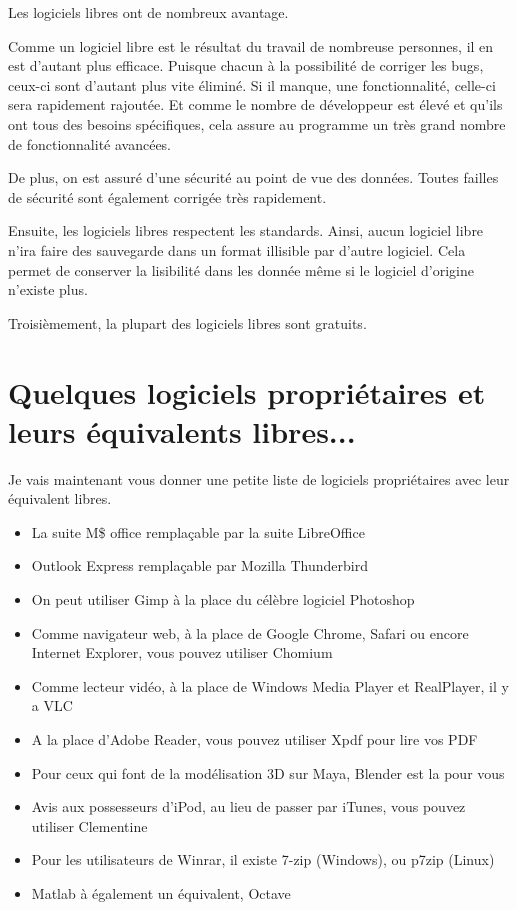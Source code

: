 Les logiciels libres ont de nombreux avantage.

Comme un logiciel libre est le résultat du travail de nombreuse personnes, il en est d'autant plus efficace. Puisque chacun à la possibilité de corriger les bugs, ceux-ci sont d'autant plus vite éliminé. Si il manque, une fonctionnalité, celle-ci sera rapidement rajoutée. Et comme le nombre de développeur est élevé et qu'ils ont tous des besoins spécifiques, cela assure au programme un très grand nombre de fonctionnalité avancées.

De plus, on est assuré d'une sécurité au point de vue des données. Toutes failles de sécurité sont également corrigée très rapidement.

Ensuite, les logiciels libres respectent les standards. Ainsi, aucun logiciel libre n'ira faire des sauvegarde dans un format illisible par d'autre logiciel. Cela permet de conserver la lisibilité dans les donnée même si le logiciel d'origine n'existe plus.

Troisièmement, la plupart des logiciels libres sont gratuits.

\section*{Quelques logiciels propriétaires et leurs équivalents libres...}

Je vais maintenant vous donner une petite liste de logiciels propriétaires avec leur équivalent libres.
\begin{itemize}
\item La suite M\$ office remplaçable par la suite LibreOffice
\item Outlook Express remplaçable par Mozilla Thunderbird
\item On peut utiliser Gimp à la place du célèbre logiciel Photoshop
\item Comme navigateur web, à la place de Google Chrome, Safari ou encore Internet Explorer, vous pouvez utiliser Chomium
\item Comme lecteur vidéo, à la place de Windows Media Player et RealPlayer, il y a VLC
\item A la place d'Adobe Reader, vous pouvez utiliser Xpdf pour lire vos PDF
\item Pour ceux qui font de la modélisation 3D sur Maya, Blender est la pour vous
\item Avis aux possesseurs d'iPod, au lieu de passer par iTunes, vous pouvez utiliser Clementine
\item Pour les utilisateurs de Winrar, il existe 7-zip (Windows), ou p7zip (Linux)
\item Matlab à également un équivalent, Octave

\end{itemize}



	
